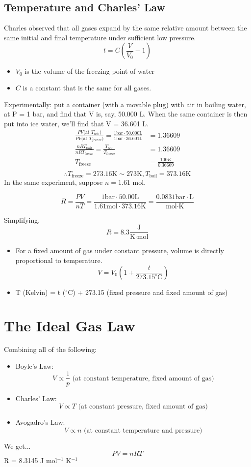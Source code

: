 \documentclass[10pt]{article}
\begin{document}
\subsection*{Temperature and Charles' Law}
Charles observed that all gases expand by the same relative amount between the same initial and final temperature under sufficient low pressure.
\[t = C\left(\frac{V}{V_0} - 1\right)\]
\begin{itemize}
    \item $V_0$ is the volume of the freezing point of water
    \item $C$ is a constant that is the same for all gases.
\end{itemize}
Experimentally: put a container (with a movable plug) with air in boiling water, at P = 1 bar, and find that V is, say, 50.000 L.  When the same container is then put into ice water, we'll find that V = 36.601 L.
\begin{align*}
\frac{PV \text{(at $T_{boil}$)}}{PV \text{(at $T_{freeze}$)}} = \frac{1\text{bar} \cdot 50.000 \text{L}}{1 \text{bar} \cdot 36.601 \text{L}} &= 1.36609\\
\frac{nRT_{\text{boil}}}{nRT_{\text{freeze}}} = \frac{T_{\text{boil}}}{T_{\text{freeze}}} &= 1.36609\\
T_{\text{freeze}} &= \frac{100K}{0.36609}\\
\end{align*}
\[\therefore T_{\text{freeze}} = 273.16\text{K}\sim273\text{K}, T_{\text{boil}} = 373.16\text{K}\]
In the same experiment, suppose $n = 1.61$ mol.

\[R = \frac{PV}{nT} = \frac{1 \text{bar} \cdot 50.00 \text{L}}{1.61 \text{mol} \cdot 373.16 \text{K}} = \frac{0.0831 \text{bar} \cdot \text{L}}{\text{mol} \cdot \text{K}}\]

Simplifying, 
\[R = 8.3 \frac{\text{J}}{\text{K} \cdot \text{mol}}\]

\begin{itemize}
    \item For a fixed amount of gas under constant pressure, volume is directly proportional to temperature.
    \[V = V_0 (1 + \frac{t}{273.15^\circ \text{C}})\]
    \item T (Kelvin) = t ($^\circ$C) + 273.15 (fixed pressure and fixed amount of gas)
\end{itemize}

\section*{The Ideal Gas Law}
Combining all of the following:
\begin{itemize}
    \item Boyle's Law:
    \[V \propto \frac{1}{p} \text{  (at constant temperature, fixed amount of gas)}\]
    \item Charles' Law:
    \[V \propto T \text{  (at constant pressure, fixed amount of gas)}\]
    \item Avogadro's Law:
    \[V \propto n \text{  (at constant temperature and pressure)}\]
\end{itemize}
We get...
\[\boxed{PV = nRT}\]
R = 8.3145 J mol$^{-1}$ K$^{-1}$
\end{document}
